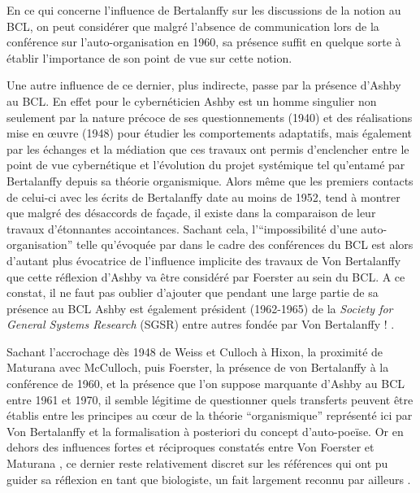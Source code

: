 En ce qui concerne l'influence de Bertalanffy sur les discussions de la notion au BCL, on peut considérer que malgré l'absence de communication lors de la conférence sur l'auto-organisation en 1960, sa présence suffit en quelque sorte à établir l'importance de son point de vue sur cette notion. 

Une autre influence de ce dernier, plus indirecte, passe par la présence d'Ashby au BCL. En effet pour \autocite[791]{Pouvreau2013} le cybernéticien Ashby est un homme singulier non seulement par la nature précoce de ses questionnements (1940) et des réalisations mise en œuvre (1948) pour étudier les comportements adaptatifs, mais également par les échanges et la médiation que ces travaux ont permis d'enclencher entre le point de vue cybernétique et l'évolution du projet systémique tel qu'entamé par Bertalanffy depuis sa théorie organismique. Alors même que les premiers contacts de celui-ci avec les écrits de Bertalanffy date au moins de 1952, \textcite[793]{Pouvreau2013} tend à montrer que malgré des désaccords de façade, il existe dans la comparaison de leur travaux d'étonnantes accointances. Sachant cela, l'\enquote{impossibilité d'une auto-organisation} telle qu'évoquée par \textcite{Ashby1962}  dans le cadre des conférences du BCL est alors d'autant plus évocatrice de l'influence implicite des travaux de Von Bertalanffy que cette réflexion d'Ashby va être considéré par Foerster au sein du BCL. A ce constat, il ne faut pas oublier d'ajouter que pendant une large partie de sa présence au BCL Ashby est également président (1962-1965) de la \textit{Society for General Systems Research} (SGSR) entre autres fondée par Von Bertalanffy ! \autocite[826]{Pouvreau2013}.

Sachant l'accrochage dès 1948 de Weiss et Culloch à Hixon, la proximité de Maturana avec McCulloch, puis Foerster, la présence de von Bertalanffy à la conférence de 1960, et la présence que l'on suppose marquante d'Ashby au BCL entre 1961 et 1970, il semble légitime de questionner quels transferts peuvent être établis entre les principes au cœur de la théorie \enquote{organismique} représenté ici par Von Bertalanffy et la formalisation à posteriori du concept d'auto-poeïse. Or en dehors des influences fortes et réciproques constatés entre Von Foerster et Maturana \autocites{Muller2007b}[255-273]{CREA1985}, ce dernier reste relativement discret sur les références qui ont pu guider sa réflexion en tant que biologiste, un fait largement reconnu par ailleurs \autocite[161]{Pangaro2007}.  

